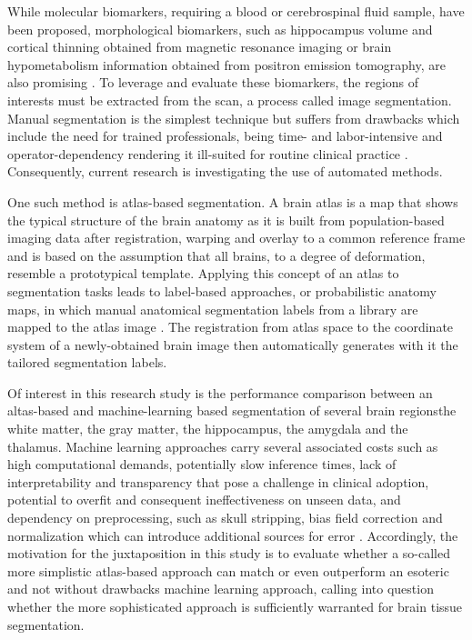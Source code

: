 While molecular biomarkers, requiring a blood or cerebrospinal fluid sample, have been proposed, morphological biomarkers, such as hippocampus volume and cortical thinning obtained from magnetic resonance imaging or brain hypometabolism information obtained from positron emission tomography, are also promising \cite{b4,b5}. To leverage and evaluate these biomarkers, the regions of interests must be extracted from the scan, a process called image segmentation. Manual segmentation is the simplest technique but suffers from drawbacks which include the need for trained professionals, being time- and labor-intensive and operator-dependency rendering it ill-suited for routine clinical practice \cite{b6}. Consequently, current research is investigating the use of automated methods.

One such method is atlas-based segmentation. A brain atlas is a map that shows the typical structure of the brain anatomy as it is built from population-based imaging data after registration, warping and overlay to a common reference frame and is based on the assumption that all brains, to a degree of deformation, resemble a prototypical template. Applying this concept of an atlas to segmentation tasks leads to label-based approaches, or probabilistic anatomy maps, in which manual anatomical segmentation labels from a library are mapped to the atlas image \cite{b7}. The registration from atlas space to the coordinate system of a newly-obtained brain image then automatically generates with it the tailored segmentation labels.

Of interest in this research study is the performance comparison between an altas-based and machine-learning based segmentation of several brain regions\textemdash{}the white matter, the gray matter, the hippocampus, the amygdala and the thalamus. Machine learning approaches carry several associated costs such as high computational demands, potentially slow inference times, lack of interpretability and transparency that pose a challenge in clinical adoption, potential to overfit and consequent ineffectiveness on unseen data, and dependency on preprocessing, such as skull stripping, bias field correction and normalization which can introduce additional sources for error \cite{b8,b9}. Accordingly, the motivation for the juxtaposition in this study is to evaluate whether a so-called more simplistic atlas-based approach can match or even outperform an esoteric and not without drawbacks machine learning approach, calling into question whether the more sophisticated approach is sufficiently warranted for brain tissue segmentation.



















